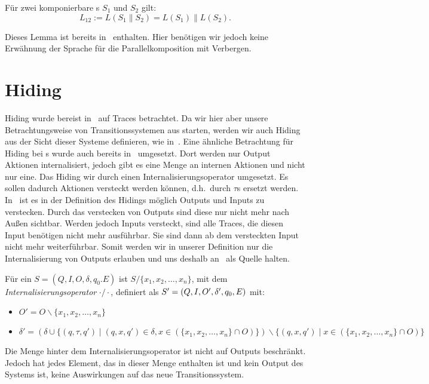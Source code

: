 \begin{lem}
  \label{LemmaSprache}
  Für zwei komponierbare \EIO{}s $S_1$ und $S_2$ gilt: \[L_{12} := L(S_1\|S_2) =
  L(S_1)\|L(S_2).\]
\end{lem}

Dieses Lemma ist bereits in~\cite{Vogler2014EIO} enthalten. Hier benötigen wir
jedoch keine Erwähnung der Sprache für die Parallelkomposition mit Verbergen.

\section{Hiding}

Hiding wurde bereist in~\cite{Chilton2013} auf Traces betrachtet. Da wir hier
aber unsere Betrachtungsweise von Transitionssystemen aus starten, werden
wir auch Hiding aus der Sicht dieser Systeme definieren, wie
in~\cite{Schlosser2012BA}. Eine ähnliche Betrachtung für Hiding bei \EIO{}s
wurde auch bereits in~\cite{Lynch1996} umgesetzt. Dort werden nur Output
Aktionen internalisiert, jedoch gibt es eine Menge an internen Aktionen und
nicht nur eine. Das Hiding wir durch einen Internalisierungsoperator
umgesetzt. Es sollen dadurch Aktionen versteckt werden können, d.h.\ durch
$\tau$s ersetzt werden. In~\cite{Chilton2013} ist es in der Definition des
Hidings möglich Outputs und Inputs zu verstecken. Durch das verstecken von
Outputs sind diese nur nicht mehr nach Außen sichtbar. Werden jedoch Inputs
versteckt, sind alle Traces, die diesen Input benötigen nicht mehr ausführbar.
Sie sind dann ab dem versteckten Input nicht mehr weiterführbar. Somit werden
wir in unserer Definition nur die Internalisierung von Outputs erlauben und uns
deshalb an~\cite{Schlosser2012BA} als Quelle halten.

\begin{Def}[Internalisierungsoperator]
  Für ein \EIO{} $S=(Q,I,O,\delta ,q_0.E)$ ist $S/\{x_1,x_2,\dots ,x_n\}$, mit
  dem \emph{Internalisierungsoperator} $\cdot /\cdot$, definiert als
  $S'=(Q,I,O',\linebreak\delta ',q_0,E)$ mit:
  \begin{itemize}
    \item $O'=O\backslash \{x_1,x_2,\dots ,x_n\}$
    \item $\delta '=(\delta\cup\{(q,\tau ,q')\mid (q,x,q')\in\delta
      ,x\in(\{x_1,x_2,\dots ,x_n\}\cap O)\})\backslash \{(q,x,q')\mid
      x\in(\{x_1,x_2,\dots ,x_n\}\cap O)\}$
  \end{itemize}
\end{Def}

Die Menge hinter dem Internalisierungsoperator ist nicht auf Outputs
beschränkt. Jedoch hat jedes Element, das in dieser Menge enthalten ist und
kein Output des Systems ist, keine Auswirkungen auf das neue Transitionssystem.
